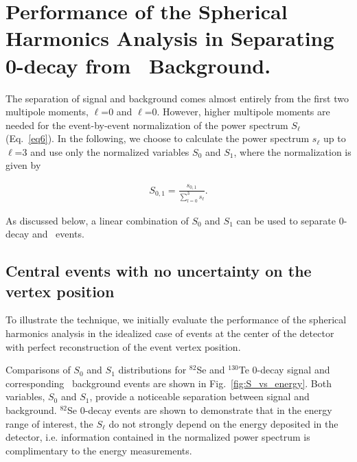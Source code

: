\section{Performance of the Spherical Harmonics Analysis in Separating 0\nbb-decay from \B~Background.}
\label{sec:performance}

The separation of signal and background comes almost entirely from the
first two multipole moments, $\ell$=0 and $\ell$=0. However, higher multipole
moments are needed for the event-by-event normalization of the power spectrum
$S_{\ell}$ (Eq.~\ref{eq6}). In the following, we choose to calculate the
power spectrum $s_{\ell}$ up to $\ell$=3 and use only the normalized variables $S_0$
and $S_1$, where the normalization is given by

\begin{eqnarray}
\label{eq7}
S_{0,1} = \frac{s_{0,1}}{\sum_{l=0}^{3} s_{\ell}}.
\end{eqnarray}

As discussed below, a linear combination of $S_0$ and $S_1$ can be
used to separate 0\nbb-decay and \B~events.


\subsection{Central events with no uncertainty on the vertex position}

To illustrate the technique, we initially evaluate 
the performance of the spherical harmonics
analysis in the idealized case of events at the center of the
detector with perfect reconstruction of the event vertex
position. 

Comparisons of $S_0$ and $S_1$ distributions for $^{82}$Se and $^{130}$Te 
0\nbb-decay signal and corresponding \B~background events are shown in 
Fig.~\ref{fig:S_vs_energy}. Both variables, $S_0$ and $S_1$, provide 
a noticeable separation between signal and background. 
$^{82}$Se 0\nbb-decay events are shown to demonstrate that in the energy 
range of interest, the $S_{\ell}$ do not strongly depend on the energy 
deposited in the detector, i.e. information contained in the normalized power
spectrum is complimentary to the energy measurements. 

